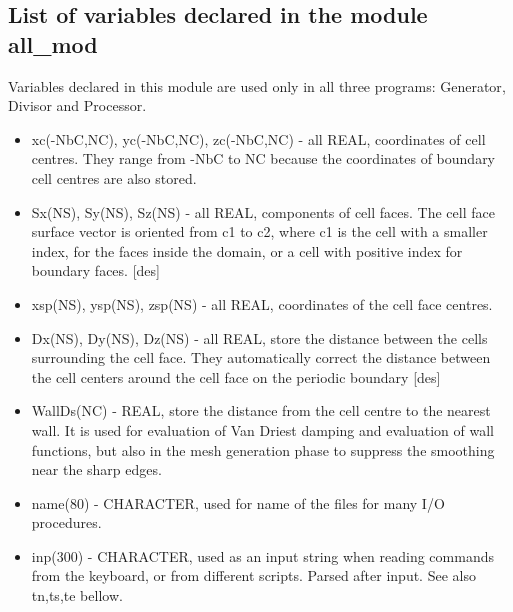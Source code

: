\documentclass[10pt]{article}
\newcommand*{\tc}{\ttfamily} %
\newcommand*{\tn}{\sffamily} %
\begin{document}
    \subsection{List of variables declared in the module {\tc all\_mod}}

    Variables declared in this module are used only in all three 
    programs: {\tn Generator}, {\tn Divisor} and {\tn Processor}.

    \begin{itemize}

    \item
    {\tc xc(-NbC,NC), yc(-NbC,NC), zc(-NbC,NC)} - all REAL, 
      coordinates of cell centres. They range from {\tc -NbC} to {\tc NC}
      because the coordinates of boundary cell centres are also stored.

    \item
    {\tc Sx(NS), Sy(NS), Sz(NS)} - all REAL, components of cell faces.
      The cell face surface vector is oriented from {\tc c1} to {\tc c2}, 
      where {\tc c1} is the cell with a smaller index, for the faces inside the
      domain, or a cell with positive index for boundary faces. [des]

    \item
    {\tc xsp(NS), ysp(NS), zsp(NS)} - all REAL, coordinates of the cell
      face centres.

    \item
    {\tc Dx(NS), Dy(NS), Dz(NS)} - all REAL, store the
      distance between the cells surrounding the cell face. They
      automatically correct the distance between the cell centers
      around the cell face on the periodic boundary [des]

    \item
    {\tc WallDs(NC)} - REAL, store the distance from the cell centre to
      the nearest wall. It is used for evaluation of Van Driest 
      damping and evaluation of wall functions, but also in the mesh
      generation phase to suppress the smoothing near the sharp edges.

    \item
    {\tc name(80)} - CHARACTER, used for name of the files for many I/O
      procedures.

    \item
    {\tc inp(300)} - CHARACTER, used as an input string when reading 
      commands from the keyboard, or from different scripts. Parsed
      after input. See also tn,ts,te bellow.


\end{itemize}
\end{document}
